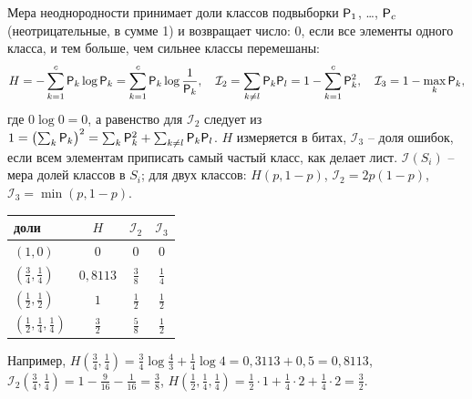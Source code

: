 \documentclass[12pt,a4paper]{article}
\begin{document}
Мера неоднородности принимает доли классов подвыборки $\mathsf{P}_1$, \dots, $\mathsf{P}_c$
(неотрицательные, в сумме 1) и возвращает число: 0, если все элементы одного класса, и
тем больше, чем сильнее классы перемешаны:
\[
  H = -\sum_{k=1}^{c}\mathsf{P}_k\log\mathsf{P}_k = \sum_{k=1}^{c}\mathsf{P}_k\log\frac{1}{\mathsf{P}_k},
  \quad
  \mathcal{I}_2 = \sum_{k \ne l}\mathsf{P}_k\mathsf{P}_l = 1 - \sum_{k=1}^{c}\mathsf{P}_k^2,
  \quad
  \mathcal{I}_3 = 1 - \max_k\mathsf{P}_k ,
\]
где $0\log 0 = 0$, а равенство для $\mathcal{I}_2$ следует из
$1 = \bigl(\sum_k\mathsf{P}_k\bigr)^2 = \sum_k\mathsf{P}_k^2 + \sum_{k \ne l}\mathsf{P}_k\mathsf{P}_l$. $H$
измеряется в битах, $\mathcal{I}_3$ -- доля ошибок, если всем элементам приписать
самый частый класс, как делает лист. $\mathcal{I}(S_i)$ -- мера долей классов в $S_i$;
для двух классов: $H(p, 1 - p)$, $\mathcal{I}_2 = 2p(1 - p)$,
$\mathcal{I}_3 = \min(p, 1 - p)$.
\begin{center}
\begin{minipage}[c]{0.43\textwidth}
\centering
\begin{tabular}{lccc}
\toprule
доли & $H$ & $\mathcal{I}_2$ & $\mathcal{I}_3$ \\
\midrule
$(1, 0)$ & $0$ & $0$ & $0$ \\[1mm]
$(\frac34, \frac14)$ & $0{,}8113$ & $\frac38$ & $\frac14$ \\[1mm]
$(\frac12, \frac12)$ & $1$ & $\frac12$ & $\frac12$ \\[1mm]
$(\frac12, \frac14, \frac14)$ & $\frac32$ & $\frac58$ & $\frac12$ \\[1mm]
\bottomrule
\end{tabular}
\end{minipage}\hfill
\begin{minipage}[c]{0.54\textwidth}
\centering
{}
\end{minipage}
\end{center}
Например,
$H(\frac34, \frac14) = \frac34\log\frac43 + \frac14\log 4 = 0{,}3113 + 0{,}5 = 0{,}8113$,
$\mathcal{I}_2(\frac34, \frac14) = 1 - \frac{9}{16} - \frac{1}{16} = \frac38$,
$H(\frac12, \frac14, \frac14) = \frac12 \cdot 1 + \frac14 \cdot 2 + \frac14 \cdot 2
= \frac32$.
\end{document}
